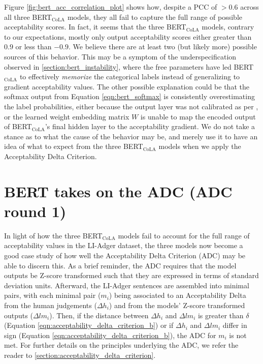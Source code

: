 Figure \ref{fig:bert_acc_correlation_plot} shows how, despite a PCC of $>0.6$ across all three BERT$_\mathrm{CoLA}$ models, they all fail to capture the full range of possible acceptability scores.  In fact, it seems that the three BERT$_\mathrm{CoLA}$ models, contrary to our expectations, mostly only output acceptability scores either greater than $0.9$ or less than $-0.9$.  We believe there are at least two (but likely more) possible sources of this behavior.  This may be a symptom of the underspecification observed in \ref{section:bert_instability}, where the free parameters have led BERT$_\mathrm{CoLA}$ to effectively \textit{memorize} the categorical labels instead of generalizing to gradient acceptability values.  The other possible explanation could be that the softmax output from Equation \ref{eqn:bert_softmax} is consistently overestimating the label probabilities, either because the output layer was not calibrated as per \citet{guo2017calibration}, or the learned weight embedding matrix $W$ is unable to map the encoded output of BERT$_\mathrm{CoLA}$'s final hidden layer to the acceptability gradient.  We do not take a stance as to what the cause of the behavior may be, and merely use it to have an idea of what to expect from the three BERT$_\mathrm{CoLA}$ models when we apply the Acceptability Delta Criterion.

\section{BERT takes on the ADC (ADC round 1)}

In light of how the three BERT$_\mathrm{CoLA}$ models fail to account for the full range of acceptability values in the LI-Adger dataset, the three models now become a good case study of how well the Acceptability Delta Criterion (ADC) may be able to discern this.  As a brief reminder, the ADC requires that the model outputs be Z-score transformed such that they are expressed in terms of standard deviation units.  Afterward, the LI-Adger sentences are assembled into minimal pairs, with each minimal pair ($m_i$) being associated to an Acceptability Delta from the human judgements ($\Delta h_i$) and from the models' Z-score transformed outputs ($\Delta lm_i$).  Then, if the distance between $\Delta h_i$ and $\Delta lm_i$ is greater than $\delta$ (Equation \ref{eqn:acceptability_delta_criterion_b}) or if $\Delta h_i$ and $\Delta lm_i$ differ in sign (Equation \ref{eqn:acceptability_delta_criterion_b}), the ADC for $m_i$ is not met.  For further details on the principles underlying the ADC, we refer the reader to \ref{section:acceptability_delta_criterion}.

